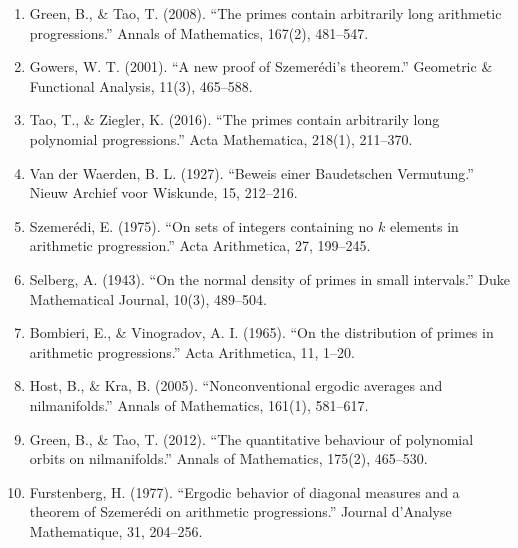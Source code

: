 \begin{enumerate}
\item Green, B., \& Tao, T. (2008). ``The primes contain arbitrarily long arithmetic progressions.'' Annals of Mathematics, 167(2), 481--547.
\item Gowers, W. T. (2001). ``A new proof of Szemer\'edi's theorem.'' Geometric \& Functional Analysis, 11(3), 465--588.
\item Tao, T., \& Ziegler, K. (2016). ``The primes contain arbitrarily long polynomial progressions.'' Acta Mathematica, 218(1), 211--370.
\item Van der Waerden, B. L. (1927). ``Beweis einer Baudetschen Vermutung.'' Nieuw Archief voor Wiskunde, 15, 212--216.
\item Szemer\'edi, E. (1975). ``On sets of integers containing no $k$ elements in arithmetic progression.'' Acta Arithmetica, 27, 199--245.
\item Selberg, A. (1943). ``On the normal density of primes in small intervals.'' Duke Mathematical Journal, 10(3), 489--504.
\item Bombieri, E., \& Vinogradov, A. I. (1965). ``On the distribution of primes in arithmetic progressions.'' Acta Arithmetica, 11, 1--20.
\item Host, B., \& Kra, B. (2005). ``Nonconventional ergodic averages and nilmanifolds.'' Annals of Mathematics, 161(1), 581--617.
\item Green, B., \& Tao, T. (2012). ``The quantitative behaviour of polynomial orbits on nilmanifolds.'' Annals of Mathematics, 175(2), 465--530.
\item Furstenberg, H. (1977). ``Ergodic behavior of diagonal measures and a theorem of Szemer\'edi on arithmetic progressions.'' Journal d'Analyse Mathematique, 31, 204--256.
\end{enumerate}
